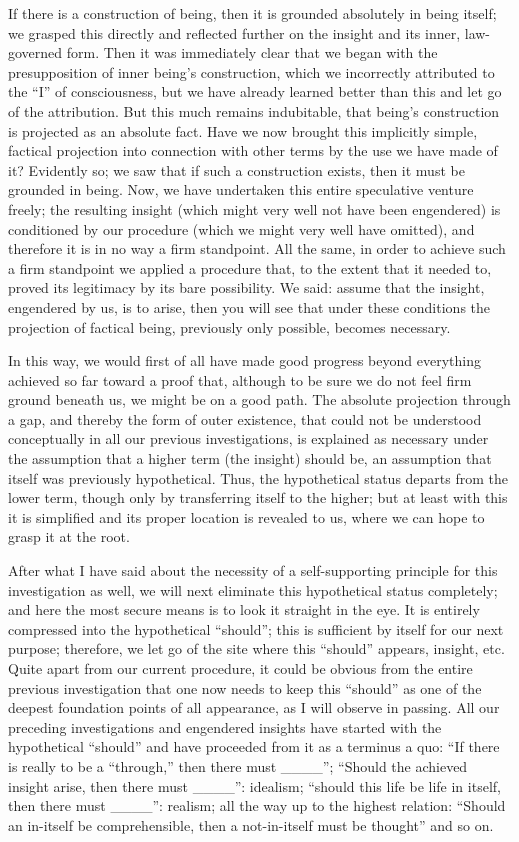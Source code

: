 If there is a construction of being,
then it is grounded absolutely in being itself;
we grasped this directly and reflected further on the
insight and its inner, law-governed form.
Then it was immediately clear that
we began with the presupposition of inner being's construction,
which we incorrectly attributed to the “I” of consciousness,
but we have already learned better than this
and let go of the attribution.
But this much remains indubitable,
that being's construction is projected as an absolute fact.
Have we now brought this implicitly simple, factical projection
into connection with other terms by the use we have made of it?
Evidently so; we saw that if such a construction exists,
then it must be grounded in being.
Now, we have undertaken this entire speculative venture freely;
the resulting insight
(which might very well not have been engendered)
is conditioned by our procedure
(which we might very well have omitted),
and therefore it is in no way a firm standpoint.
All the same, in order to achieve such a firm standpoint
we applied a procedure that, to the extent that it needed to,
proved its legitimacy by its bare possibility.
We said: assume that the insight, engendered by us,
is to arise, then you will see that under these conditions
the projection of factical being, previously only possible,
becomes necessary.

In this way, we would first of all have made
good progress beyond everything achieved so far
toward a proof that, although to be sure
we do not feel firm ground beneath us,
we might be on a good path.
The absolute projection through a gap,
and thereby the form of outer existence,
that could not be understood conceptually
in all our previous investigations,
is explained as necessary
under the assumption that
a higher term (the insight) should be,
an assumption that itself was previously hypothetical.
Thus, the hypothetical status departs from the lower term,
though only by transferring itself to the higher;
but at least with this it is simplified
and its proper location is revealed to us,
where we can hope to grasp it at the root.

After what I have said about the necessity
of a self-supporting principle for this investigation as well,
we will next eliminate this hypothetical status completely;
and here the most secure means is to look it straight in the eye.
It is entirely compressed into the hypothetical “should”;
this is sufficient by itself for our next purpose;
therefore, we let go of the site
where this “should” appears, insight, etc.
Quite apart from our current procedure,
it could be obvious from the entire previous investigation
that one now needs to keep this “should”
as one of the deepest foundation points of all appearance,
as I will observe in passing.
All our preceding investigations and engendered
insights have started with the hypothetical “should”
and have proceeded from it as a terminus a quo:
“If there is really to be a “through,” then there must ____”;
“Should the achieved insight arise, then there must ____”: idealism;
“should this life be life in itself, then there must ____”: realism;
all the way up to the highest relation:
“Should an in-itself be comprehensible,
then a not-in-itself must be thought” and so on.

